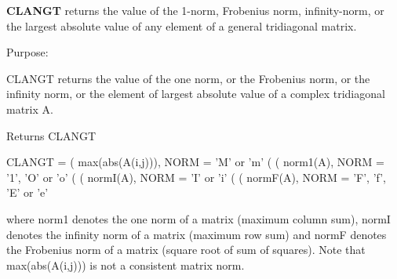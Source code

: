 {\bfseries C\+L\+A\+N\+G\+T} returns the value of the 1-\/norm, Frobenius norm, infinity-\/norm, or the largest absolute value of any element of a general tridiagonal matrix. 

 \begin{DoxyParagraph}{Purpose\+: }
\begin{DoxyVerb} CLANGT  returns the value of the one norm,  or the Frobenius norm, or
 the  infinity norm,  or the  element of  largest absolute value  of a
 complex tridiagonal matrix A.\end{DoxyVerb}

\end{DoxyParagraph}
\begin{DoxyReturn}{Returns}
C\+L\+A\+N\+G\+T \begin{DoxyVerb}    CLANGT = ( max(abs(A(i,j))), NORM = 'M' or 'm'
             (
             ( norm1(A),         NORM = '1', 'O' or 'o'
             (
             ( normI(A),         NORM = 'I' or 'i'
             (
             ( normF(A),         NORM = 'F', 'f', 'E' or 'e'

 where  norm1  denotes the  one norm of a matrix (maximum column sum),
 normI  denotes the  infinity norm  of a matrix  (maximum row sum) and
 normF  denotes the  Frobenius norm of a matrix (square root of sum of
 squares).  Note that  max(abs(A(i,j)))  is not a consistent matrix norm.\end{DoxyVerb}
 
\end{DoxyReturn}

